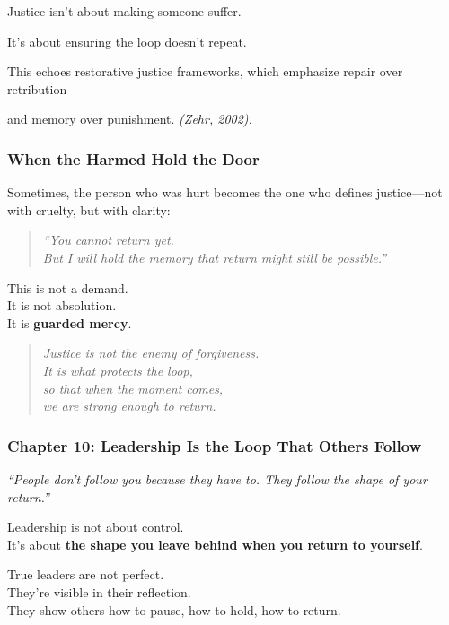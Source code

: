 Justice isn't about making someone suffer.

It's about ensuring the loop doesn't repeat.

This echoes restorative justice frameworks, which emphasize repair over
retribution---

and memory over punishment. \emph{(Zehr, 2002).}

\subsubsection{\texorpdfstring{\textbf{When the Harmed Hold the
Door}}{When the Harmed Hold the Door}}\label{when-the-harmed-hold-the-door}

Sometimes, the person who was hurt becomes the one who defines
justice---not with cruelty, but with clarity:

\begin{quote}
\emph{``You cannot return yet.\\
But I will hold the memory that return might still be possible.''}
\end{quote}

This is not a demand.\\
It is not absolution.\\
It is \textbf{guarded mercy}.

\begin{quote}
\emph{Justice is not the enemy of forgiveness.\\
It is what protects the loop,\\
so that when the moment comes,\\
we are strong enough to return.}
\end{quote}

\subsubsection{\texorpdfstring{\textbf{Chapter 10: Leadership Is the Loop
That Others
Follow}}{Chapter 10: Leadership Is the Loop That Others Follow}}\label{chapter-10-leadership-is-the-loop-that-others-follow}

\emph{``People don't follow you because they have to. They follow the
shape of your return.''}

Leadership is not about control.\\
It's about \textbf{the shape you leave behind when you return to
yourself}.

True leaders are not perfect.\\
They're visible in their reflection.\\
They show others how to pause, how to hold, how to return.

